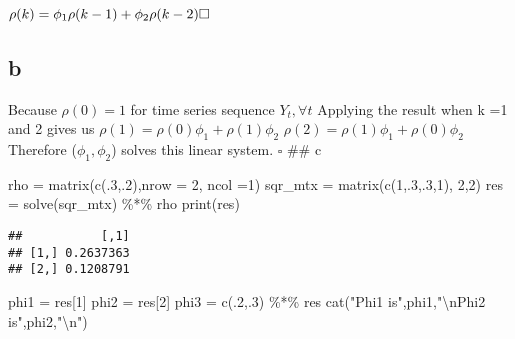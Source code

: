 \documentclass[
]{article}
\newenvironment{Shaded}{\begin{snugshade}}{\end{snugshade}}
\newcommand{\AttributeTok}[1]{\textcolor[rgb]{0.77,0.63,0.00}{#1}}
\newcommand{\DecValTok}[1]{\textcolor[rgb]{0.00,0.00,0.81}{#1}}
\newcommand{\FunctionTok}[1]{\textcolor[rgb]{0.00,0.00,0.00}{#1}}
\newcommand{\NormalTok}[1]{#1}
\newcommand{\OtherTok}[1]{\textcolor[rgb]{0.56,0.35,0.01}{#1}}
\newcommand{\SpecialCharTok}[1]{\textcolor[rgb]{0.00,0.00,0.00}{#1}}
\newcommand{\StringTok}[1]{\textcolor[rgb]{0.31,0.60,0.02}{#1}}
\begin{document}
\(\rho(k) = \phi_1\rho(k-1) + \phi_2\rho(k-2)\\ \square\)

\hypertarget{b-1}{%
\subsection{b}\label{b-1}}

Because \(\rho(0) = 1\) for time series sequence \(Y_t, \forall t\)
Applying the result when k =1 and 2 gives us
\(\rho(1) = \rho(0)\phi_1 +\rho(1)\phi_2\)
\(\rho(2) = \rho(1)\phi_1 +\rho(0)\phi_2\) Therefore (\(\phi_1,\phi_2\))
solves this linear system. \(\square\) \#\# c

\begin{Shaded}
\begin{Highlighting}[]
\NormalTok{rho }\OtherTok{=} \FunctionTok{matrix}\NormalTok{(}\FunctionTok{c}\NormalTok{(.}\DecValTok{3}\NormalTok{,.}\DecValTok{2}\NormalTok{),}\AttributeTok{nrow =} \DecValTok{2}\NormalTok{, }\AttributeTok{ncol =}\DecValTok{1}\NormalTok{)}
\NormalTok{sqr\_mtx }\OtherTok{=} \FunctionTok{matrix}\NormalTok{(}\FunctionTok{c}\NormalTok{(}\DecValTok{1}\NormalTok{,.}\DecValTok{3}\NormalTok{,.}\DecValTok{3}\NormalTok{,}\DecValTok{1}\NormalTok{), }\DecValTok{2}\NormalTok{,}\DecValTok{2}\NormalTok{)}
\NormalTok{res }\OtherTok{=} \FunctionTok{solve}\NormalTok{(sqr\_mtx) }\SpecialCharTok{\%*\%}\NormalTok{ rho}
\FunctionTok{print}\NormalTok{(res)}
\end{Highlighting}
\end{Shaded}

\begin{verbatim}
##           [,1]
## [1,] 0.2637363
## [2,] 0.1208791
\end{verbatim}

\begin{Shaded}
\begin{Highlighting}[]
\NormalTok{phi1 }\OtherTok{=}\NormalTok{ res[}\DecValTok{1}\NormalTok{]}
\NormalTok{phi2 }\OtherTok{=}\NormalTok{ res[}\DecValTok{2}\NormalTok{]}
\NormalTok{phi3 }\OtherTok{=} \FunctionTok{c}\NormalTok{(.}\DecValTok{2}\NormalTok{,.}\DecValTok{3}\NormalTok{) }\SpecialCharTok{\%*\%}\NormalTok{ res}
\FunctionTok{cat}\NormalTok{(}\StringTok{"Phi1 is"}\NormalTok{,phi1,}\StringTok{"}\SpecialCharTok{\textbackslash{}n}\StringTok{Phi2 is"}\NormalTok{,phi2,}\StringTok{"}\SpecialCharTok{\textbackslash{}n}\StringTok{"}\NormalTok{)}
\end{Highlighting}
\end{Shaded}
\end{document}
